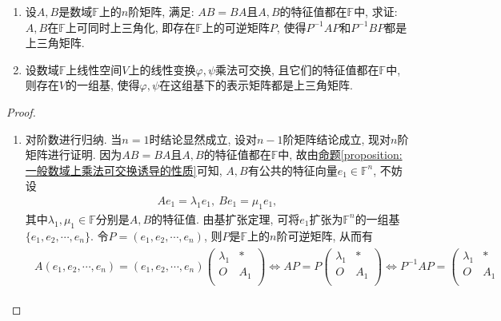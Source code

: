\documentclass[../../main.tex]{subfiles}
\begin{document}
\begin{proposition}\label{proposition:乘法可交换诱导同时上三角化}
\begin{enumerate}
\item 设\(A,B\)是数域\(\mathbb{F}\)上的\(n\)阶矩阵, 满足: \(AB = BA\)且\(A,B\)的特征值都在\(\mathbb{F}\)中, 求证: \(A,B\)在\(\mathbb{F}\)上可同时上三角化, 即存在\(\mathbb{F}\)上的可逆矩阵\(P\), 使得\(P^{-1}AP\)和\(P^{-1}BP\)都是上三角矩阵.

\item 设数域\(\mathbb{F}\)上线性空间\(V\)上的线性变换\(\varphi,\psi\)乘法可交换, 且它们的特征值都在\(\mathbb{F}\)中, 则存在\(V\)的一组基, 使得\(\varphi,\psi\)在这组基下的表示矩阵都是上三角矩阵. 
\end{enumerate}
\end{proposition}
\begin{proof}
\begin{enumerate}
\item 对阶数进行归纳. 当\(n = 1\)时结论显然成立, 设对\(n - 1\)阶矩阵结论成立, 现对\(n\)阶矩阵进行证明. 因为\(AB = BA\)且\(A,B\)的特征值都在\(\mathbb{F}\)中, 故由\hyperref[proposition:一般数域上乘法可交换诱导的性质]{命题\ref{proposition:一般数域上乘法可交换诱导的性质}}可知, \(A,B\)有公共的特征向量\(e_{1} \in \mathbb{F}^n\), 不妨设
\begin{align*}
Ae_{1}=\lambda_{1}e_{1},\ Be_{1}=\mu_{1}e_{1},
\end{align*}
其中\(\lambda_{1},\mu_{1} \in \mathbb{F}\)分别是\(A,B\)的特征值. 由基扩张定理, 可将\(e_{1}\)扩张为\(\mathbb{F}^n\)的一组基\(\{e_{1},e_{2},\cdots ,e_{n}\}\). 令\(P=(e_{1},e_{2},\cdots ,e_{n})\), 则\(P\)是\(\mathbb{F}\)上的\(n\)阶可逆矩阵, 从而有
\begin{align}\label{proposition-07-1.1}
\begin{aligned}
A\left( e_1,e_2,\cdots ,e_n \right) =\left( e_1,e_2,\cdots ,e_n \right) \left( \begin{matrix}
\lambda _1&		*\\
O&		A_1\\
\end{matrix} \right) \Leftrightarrow AP=P\left( \begin{matrix}
\lambda _1&		*\\
O&		A_1\\
\end{matrix} \right) \Leftrightarrow P^{-1}AP=\left( \begin{matrix}
\lambda _1&		*\\
O&		A_1\\

\end{matrix}
\end{aligned}
\end{align}
\end{enumerate}
\end{proof}
\end{document}
